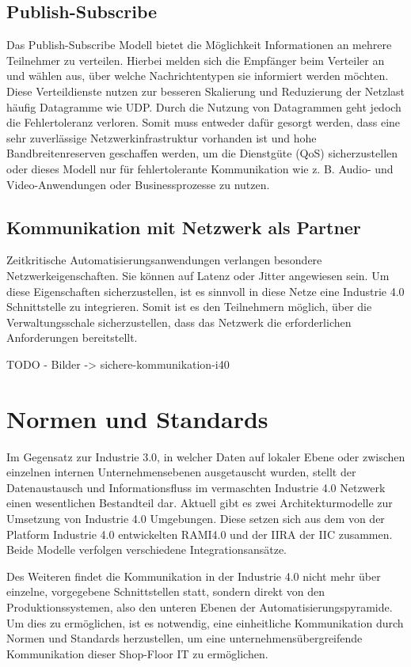 \subsection{Publish-Subscribe}
Das Publish-Subscribe Modell bietet die Möglichkeit Informationen an mehrere Teilnehmer zu verteilen. Hierbei melden sich die Empfänger beim Verteiler an und wählen aus, über welche Nachrichtentypen sie informiert werden möchten. Diese Verteildienste nutzen zur besseren Skalierung und Reduzierung der Netzlast häufig Datagramme wie \ac{UDP}. Durch die Nutzung von Datagrammen geht jedoch die Fehlertoleranz verloren. Somit muss entweder dafür gesorgt werden, dass eine sehr zuverlässige Netzwerkinfrastruktur vorhanden ist und hohe Bandbreitenreserven geschaffen werden, um die Dienstgüte (\ac{QoS}) sicherzustellen oder dieses Modell nur für fehlertolerante Kommunikation wie z. B. Audio- und Video-Anwendungen oder Businessprozesse zu nutzen. 

\subsection{Kommunikation mit Netzwerk als Partner}
Zeitkritische Automatisierungsanwendungen verlangen besondere Netzwerkeigenschaften. Sie können auf Latenz oder Jitter angewiesen sein. Um diese Eigenschaften sicherzustellen, ist es sinnvoll in diese Netze eine Industrie 4.0 Schnittstelle zu integrieren. Somit ist es den Teilnehmern möglich, über die Verwaltungsschale sicherzustellen, dass das Netzwerk die erforderlichen Anforderungen bereitstellt. \cite{sichKom2017}

TODO - Bilder -> sichere-kommunikation-i40

\section{Normen und Standards}
Im Gegensatz zur Industrie 3.0, in welcher Daten auf lokaler Ebene oder zwischen einzelnen internen Unternehmensebenen ausgetauscht wurden, stellt der Datenaustausch und Informationsfluss im vermaschten Industrie 4.0 Netzwerk einen wesentlichen Bestandteil dar. Aktuell gibt es zwei Architekturmodelle zur Umsetzung von Industrie 4.0 Umgebungen. Diese setzen sich aus dem von der Platform Industrie 4.0 entwickelten \ac{RAMI4.0} und der \ac{IIRA} der \ac{IIC} zusammen. Beide Modelle verfolgen verschiedene Integrationsansätze.

Des Weiteren findet die Kommunikation in der Industrie 4.0 nicht mehr über einzelne, vorgegebene Schnittstellen statt, sondern direkt von den Produktionssystemen, also den unteren Ebenen der Automatisierungspyramide. Um dies zu ermöglichen, ist es notwendig, eine einheitliche Kommunikation durch Normen und Standards herzustellen, um eine unternehmensübergreifende Kommunikation dieser Shop-Floor IT zu ermöglichen. 

